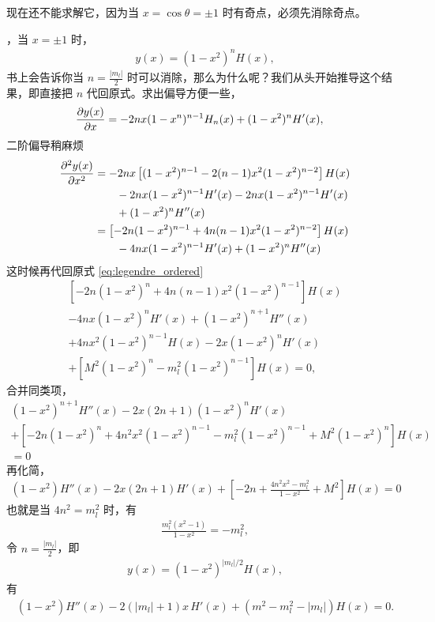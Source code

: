 现在还不能求解它，因为当 $x = \cos\theta = \pm1$ 时有奇点，必须先消除奇点。

，当 $x = \pm 1$ 时，
\begin{align}
    y(x) = (1 - x^2)^n H(x),
\end{align}
书上会告诉你当 $n = \frac{|m_l|}2$ 时可以消除，那么为什么呢？我们从头开始推导这个结果，即直接把 $n$ 代回原式。求出偏导方便一些，
\begin{align}
    &\pdv{y(x)}{x} = -2n x (1-x^n)^{n-1} H_n(x) + (1-x^2)^n H'(x),
\end{align}
二阶偏导稍麻烦
\begin{align}
    \pdv[2]{y(x)}{x} &= -2n x \left[
        (1-x^2)^{n-1} - 2(n-1)x^2(1-x^2)^{n-2}
    \right]H(x)  \notag\\
    &\quad\quad
    - 2n x(1-x^2)^{n-1} H'(x) 
    - 2n x(1-x^2)^{n-1} H'(x) \notag\\
    &\quad\quad + (1-x^2)^n H''(x) \\
    & = \left[
        -2n (1-x^2)^{n-1} + 4n (n-1) x^2 (1-x^2)^{n-2}
    \right] H(x) \notag\\
    &\quad\quad - 4nx(1-x^2)^{n-1} H'(x) + 
    (1-x^2)^n H''(x)
\end{align}
这时候再代回原式 \eqref{eq:legendre_ordered}
\begin{multline}
    \left[
        -2n (1-x^2)^n + 4n(n-1) x^2 (1-x^2)^{n-1}
    \right] H(x) \\
    - 4nx(1-x^2)^n H'(x) + (1-x^2)^{n+1} H''(x) \\
    + 4nx^2 (1-x^2)^{n-1} H(x) 
    - 2x (1-x^2)^n H'(x) \\
    +\left[
        M^2 (1-x^2)^n - m_l^2 (1-x^2)^{n-1}
    \right] H(x) = 0,
\end{multline}
合并同类项，
\begin{multline}
    (1-x^2)^{n+1} H''(x) - 2x(2n+1) (1-x^2)^n H'(x) 
    \\+ 
    \left[
        -2n (1-x^2)^n + 4n^2 x^2 (1-x^2)^{n-1} - m_l^2 (1-x^2)^{n-1} + M^2 (1-x^2)^n
    \right] H(x) \\= 0
\end{multline}
再化简，
\begin{align}
    (1-x^2) H''(x) - 2x(2n+1) H'(x) + \left[
        -2n + \frac{4n^2x^2 - m_l^2}{1-x^2} + M^2
    \right] H(x) = 0
\end{align}
也就是当 $4n^2 = m_l^2$ 时，有
\begin{align}
    \frac{m_l^2 (x^2 - 1)}{1 - x^2} = - m_l^2,
\end{align}
令 $n = \frac{|m_l|}2$，即
\begin{align}
    y(x) = (1 - x^2)^{|m_l|/2} H(x),
\end{align}
有
\begin{align}
    (1-x^2) H''(x) - 2\left(|m_l| + 1\right)x \, H'(x) + \left(m^2 - m_l^2 - |m_l|\right) H(x) = 0. 
\end{align}

